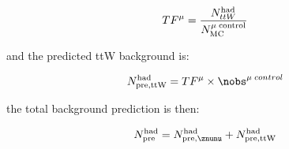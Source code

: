 \begin{equation}
  \label{equ:ratio-denom2}
  TF^{\mu} = \frac{N_{ttW}^{\rm had}}{N_{\rm MC}^{\rm \mu\; control}}
\end{equation}

and the predicted ttW background is:

\begin{equation}
  \label{equ:pre-ttw}
  N_{\rm pre, ttW}^{\rm had} = TF^{\mu} \times {\nobs^{\mu\;control}}
\end{equation}

the total background prediction is then:

\begin{equation}
  \label{equ:pre-ttw}
  N_{\rm pre}^{\rm had} =  N_{\rm pre, \znunu}^{\rm had} + N_{\rm pre, ttW}^{\rm had}
\end{equation}





 

